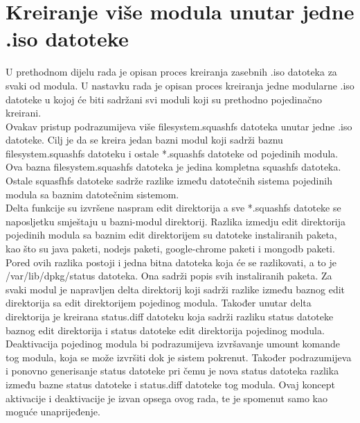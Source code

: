\documentclass[12pt,vi]{mitthesis}
\begin{document}
\chapter*{Kreiranje više modula unutar jedne .iso datoteke}
\indent
U prethodnom dijelu rada je opisan proces kreiranja zasebnih .iso datoteka za svaki od modula. U nastavku rada je opisan proces kreiranja jedne modularne .iso datoteke u kojoj će biti sadržani svi moduli koji su prethodno pojedinačno kreirani.\\
Ovakav pristup podrazumijeva više filesystem.squashfs datoteka unutar jedne .iso datoteke. Cilj je da se kreira jedan bazni modul koji sadrži baznu filesystem.squashfs datoteku i ostale *.squashfs datoteke od pojedinih modula. Ova bazna filesystem.squashfs datoteka je jedina kompletna squashfs datoteka. Ostale squasfhfs datoteke sadrže razlike između datotečnih sistema pojedinih modula sa baznim datotečnim sistemom.\\
Delta funkcije su izvršene naspram edit direktorija a sve *.squashfs datoteke se naposljetku smještaju u bazni-modul direktorij.
\indent
Razlika izmedju edit direktorija pojedinih modula sa baznim edit direktorijem su datoteke instaliranih paketa, kao što su java paketi, nodejs paketi, google-chrome paketi i mongodb paketi. Pored ovih razlika postoji i jedna bitna datoteka koja će se razlikovati, a to je /var/lib/dpkg/status datoteka. Ona sadrži popis svih instaliranih paketa. Za svaki modul je napravljen delta direktorij koji sadrži razlike između baznog edit direktorija sa edit direktorijem pojedinog modula. Također unutar delta direktorija je kreirana status.diff datoteku koja sadrži razliku status datoteke baznog edit direktorija i status datoteke edit direktorija pojedinog modula.\\
\indent
Deaktivacija pojedinog modula bi podrazumijeva izvršavanje umount komande tog modula, koja se može izvršiti dok je sistem pokrenut. Također podrazumijeva i ponovno generisanje status datoteke pri čemu je nova status datoteka razlika između bazne status datoteke i status.diff datoteke tog modula. Ovaj koncept aktivacije i deaktivacije je izvan opsega ovog rada, te je spomenut samo kao moguće unaprijeđenje.
\end{document}
